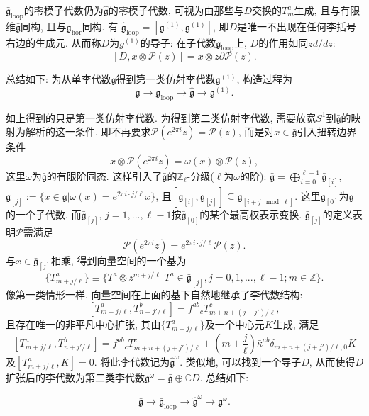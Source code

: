\documentclass{ctexart}%
\theoremstyle{definition}
\theoremstyle{remark}
\begin{document}
$\bar{\mathfrak{g}}_{\text{loop}}$的零模子代数仍为$\hat{\mathfrak{g}}$的零模子代数, 可视为由那些与$D$交换的$T^a_m$生成, 且与有限维$\bar{\mathfrak{g}}$同构, 且与$\mathfrak{g}_{\text{hor}}$同构. 有 $\hat{\mathfrak{g}}_{\text{loop}} = [\mathfrak{g}^{(1)},\mathfrak{g}^{(1)}]$, 即$D$是唯一不出现在任何李括号右边的生成元. 从而称$D$为$g^{(1)}$的导子: 在子代数$\bar{\mathfrak{g}}_{\text{loop}}$上, $D$的作用如同$z d/dz$:
$$[D,x\otimes \mathcal{P}(z)] = x\otimes z\partial \mathcal{P}(z).$$

总结如下: 为从单李代数$\bar{\mathfrak{g}}$得到第一类仿射李代数$\mathfrak{g}^{(1)}$, 构造过程为
$$\bar{\mathfrak{g}}\rightarrow \bar{\mathfrak{g}}_{\text{loop}} \rightarrow \hat{\mathfrak{g}} \rightarrow \mathfrak{g}^{(1)}.$$


如上得到的只是第一类仿射李代数. 为得到第二类仿射李代数, 需要放宽$S^1$到$\bar{\mathfrak{g}}$的映射为解析的这一条件, 即不再要求$\mathcal{P}(e^{2\pi i}z)=\mathcal{P}(z)$, 而是对$x\in \bar{\mathfrak{g}}$引入扭转边界条件
$$x\otimes \mathcal{P}(e^{2\pi i} z)=\omega(x)\otimes\mathcal{P}(z),$$
这里$\omega$为$\bar{\mathfrak{g}}$的有限阶同态. 这样引入了$\bar{\mathfrak{g}}$的$\mathbb{Z}_\ell$-分级($\ell$为$\omega$的阶):
$\bar{\mathfrak{g}} = \bigoplus_{i=0}^{\ell-1} \bar{\mathfrak{g}}_{[i]}$, $\bar{\mathfrak{g}}_{[j]} :=\{x\in \bar{\mathfrak{g}}
|\omega(x) = e^{2\pi i\cdot j/\ell} x\}$, 且$[\bar{\mathfrak{g}}_{[i]},\bar{\mathfrak{g}}_{[j]}]\subseteq \bar{\mathfrak{g}}_{[i+j\mod \ell]}$. 这里$\bar{\mathfrak{g}}_{[0]}$为$\bar{\mathfrak{g}}$的一个子代数, 而$\bar{\mathfrak{g}}_{[j]}$, $j=1,...,\ell-1$按$\bar{\mathfrak{g}}_{[0]}$的某个最高权表示变换. $\bar{\mathfrak{g}}_{[j]}$的定义表明$\mathcal{P}$需满足
$$\mathcal{P}(e^{2\pi i} z) = e^{2\pi i\cdot j/\ell} \mathcal{P}(z).$$
与$x\in\bar{\mathfrak{g}}_{[j]}$相乘, 得到向量空间的一个基为
$$\{T^a_{m+j/\ell}\} \equiv \{T^a\otimes z^{m+j/\ell}|T^a\in \bar{\mathfrak{g}}_{[j]},j=0,1,...,\ell-1;m\in\mathbb{Z}\}.$$
像第一类情形一样, 向量空间在上面的基下自然地继承了李代数结构:
$$[T^a_{m+j/\ell},T^b_{n+j'/\ell}] = f^{ab}{}_c T^c_{m+n+(j+j')/\ell},$$
且存在唯一的非平凡中心扩张, 其由$\{T^a_{m+j/\ell}\}$及一个中心元$K$生成, 满足
$$[T^a_{m+j/\ell},T^b_{n+j'/\ell}] = f^{ab}{}_c T^c_{m+n+(j+j')/\ell
} + \left( m + \frac{j}{\ell}\right) \bar{\kappa}^{ab} \delta_{m+n+(j+j')/\ell,0} K$$
及$[T^a_{m+j/\ell},K]=0$. 将此李代数记为$\hat{\mathfrak{g}}^{\omega}$. 类似地, 可以找到一个导子$D$, 从而使得$D$扩张后的李代数为第二类李代数$\mathfrak{g}^{\omega} = \bar{\mathfrak{g}}\oplus \mathbb{C} D$.  总结如下:

$$\bar{\mathfrak{g}}\rightarrow \bar{\mathfrak{g}}_{\text{loop}} \rightarrow \hat{\mathfrak{g}}^{\omega} \rightarrow \mathfrak{g}^{\omega}.$$
\end{document}

